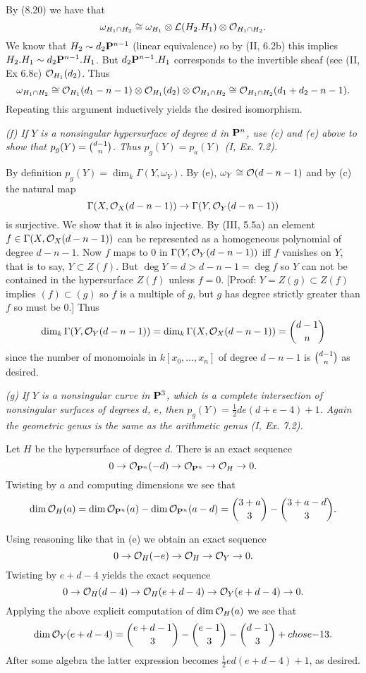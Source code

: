\documentclass[12pt]{article}
\begin{document}
By (8.20) we have that
$$\omega_{H_1\intersect H_2}\isom\omega_{H_1}\tensor\sL(H_2.H_1)\tensor\sO_{H_1\intersect H_2}.$$
We know that $H_2\sim d_2\P^{n-1}$ (linear equivalence) so
by (II, 6.2b) this implies $H_2.H_1\sim d_2\P^{n-1}.H_1$. 
But $d_2\P^{n-1}.H_1$ corresponds to the invertible sheaf (see (II, Ex 6.8c)
$\sO_{H_1}(d_2)$. Thus
$$\omega_{H_1\intersect H_2}\isom\sO_{H_1}(d_1-n-1)\tensor\sO_{H_1}(d_2)\tensor\sO_{H_1\intersect H_2}\isom\sO_{H_1\intersect H_2}(d_1+d_2-n-1).$$
Repeating this argument inductively yields the desired isomorphism. 

{\em (f) If $Y$ is a nonsingular hypersurface of degree $d$ in $\P^n$,
use (c) and (e) above to show that $p_g(Y)=\chose{d-1}{n}$. Thus
$p_g(Y)=p_a(Y)$ (I, Ex. 7.2).} 

By definition $p_g(Y)=\dim_k\Gamma(Y,\omega_Y)$. By (e),
$\omega_Y\isom\sO(d-n-1)$ and by (c) the natural map
$$\Gamma(X,\sox(d-n-1))\into\Gamma(Y,\soy(d-n-1))$$
is surjective. We show that it is also injective.
By (III, 5.5a) an element $f\in\Gamma(X,\sox(d-n-1))$ can be represented as
a homogeneous polynomial of degree $d-n-1$.
Now $f$ maps to $0$ in $\Gamma(Y,\soy(d-n-1))$ iff
$f$ vanishes on $Y$, that is to say, $Y\subset Z(f)$. But
$\deg Y=d>d-n-1=\deg f$ so $Y$ can not be contained in the hypersurface
$Z(f)$ unless $f=0$. [Proof: $Y=Z(g)\subset Z(f)$ implies
$(f)\subset (g)$ so $f$ is a multiple of $g$, but $g$ has degree
strictly greater than $f$ so must be $0$.]
Thus 
$$\dim_k \Gamma(Y,\soy(d-n-1))=\dim_k \Gamma(X,\sox(d-n-1))
             =\chose{d-1}{n}$$
since the number of monomoials in $k[x_0,\ldots, x_n]$ of degree
$d-n-1$ is $\chose{d-1}{n}$
as desired. 

{\em (g) If $Y$ is a nonsingular curve in $\P^3$, which is a complete
intersection of nonsingular surfaces of degrees $d$, $e$, then
$p_g(Y)=\frac{1}{2}de(d+e-4)+1$. Again the geometric genus is
the same as the arithmetic genus (I, Ex. 7.2).}

Let $H$ be the hypersurface of degree $d$.
There is an exact sequence
$$0\into\sO_{\P^n}(-d)\into\sO_{\P^n}\into\sO_H\into 0.$$
Twisting by $a$ and computing dimensions we see that
$$\dim\sO_H(a)=\dim\sO_{\P^n}(a)-\dim\sO_{\P^n}(a-d)=\chose{3+a}{3}-\chose{3+a-d}{3}.$$

Using reasoning like that in (e) we obtain an exact sequence
$$0\into\sO_H(-e)\into\sO_H\into\sO_Y\into 0.$$
Twisting by $e+d-4$ yields the exact sequence
$$0\into\sO_H(d-4)\into\sO_H(e+d-4)\into\sO_Y(e+d-4)\into 0.$$
Applying the above explicit computation of $\dim\sO_H(a)$ we see that
$$\dim\soy(e+d-4)=\chose{e+d-1}{3}-\chose{e-1}{3}-\chose{d-1}{3}+chose{-1}{3}.$$
After some algebra the latter expression becomes
$\frac{1}{2}ed(e+d-4)+1$, as desired. 
\end{document}
